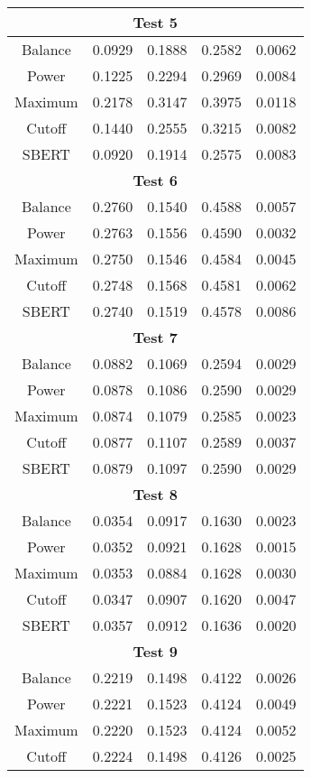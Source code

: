 \documentclass{article}
\begin{document}
\begin{table}[H]
{\begin{tabular}{|c|c|c|c|c|}
\multicolumn{5}{|c|}{\textbf{Test 5}} \\ \hline
Balance & 0.0929 & 0.1888 & 0.2582 & 0.0062 \\ \hline
Power & 0.1225 & 0.2294 & 0.2969 & 0.0084 \\ \hline
Maximum & 0.2178 & 0.3147 & 0.3975 & 0.0118 \\ \hline
Cutoff & 0.1440 & 0.2555 & 0.3215 & 0.0082 \\ \hline
SBERT & 0.0920 & 0.1914 & 0.2575 & 0.0083 \\ \hline
\multicolumn{5}{|c|}{\textbf{Test 6}} \\ \hline
Balance & 0.2760 & 0.1540 & 0.4588 & 0.0057 \\ \hline
Power & 0.2763 & 0.1556 & 0.4590 & 0.0032 \\ \hline
Maximum & 0.2750 & 0.1546 & 0.4584 & 0.0045 \\ \hline
Cutoff & 0.2748 & 0.1568 & 0.4581 & 0.0062 \\ \hline
SBERT & 0.2740 & 0.1519 & 0.4578 & 0.0086 \\ \hline
\multicolumn{5}{|c|}{\textbf{Test 7}} \\ \hline
Balance & 0.0882 & 0.1069 & 0.2594 & 0.0029 \\ \hline
Power & 0.0878 & 0.1086 & 0.2590 & 0.0029 \\ \hline
Maximum & 0.0874 & 0.1079 & 0.2585 & 0.0023 \\ \hline
Cutoff & 0.0877 & 0.1107 & 0.2589 & 0.0037 \\ \hline
SBERT & 0.0879 & 0.1097 & 0.2590 & 0.0029 \\ \hline
\multicolumn{5}{|c|}{\textbf{Test 8}} \\ \hline
Balance & 0.0354 & 0.0917 & 0.1630 & 0.0023 \\ \hline
Power & 0.0352 & 0.0921 & 0.1628 & 0.0015 \\ \hline
Maximum & 0.0353 & 0.0884 & 0.1628 & 0.0030 \\ \hline
Cutoff & 0.0347 & 0.0907 & 0.1620 & 0.0047 \\ \hline
SBERT & 0.0357 & 0.0912 & 0.1636 & 0.0020 \\ \hline
\multicolumn{5}{|c|}{\textbf{Test 9}} \\ \hline
Balance & 0.2219 & 0.1498 & 0.4122 & 0.0026 \\ \hline
Power & 0.2221 & 0.1523 & 0.4124 & 0.0049 \\ \hline
Maximum & 0.2220 & 0.1523 & 0.4124 & 0.0052 \\ \hline
Cutoff & 0.2224 & 0.1498 & 0.4126 & 0.0025 \\ \hline

\end{tabular}}
\end{table}
\end{document}

